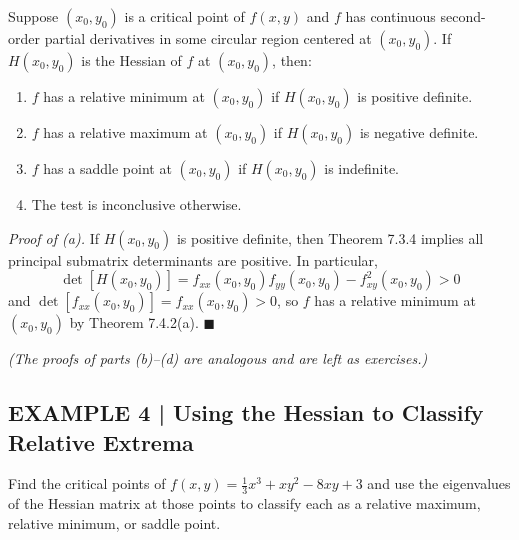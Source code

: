 \documentclass{article}
\begin{document}
\begin{tcolorbox}[colback=red!4, colframe=red!60!black,
  title={\textbf{Theorem 7.4.3 --- Hessian Form of the Second Derivative Test}},
  boxrule=0.5mm, arc=3mm]
Suppose $(x_0,y_0)$ is a critical point of $f(x,y)$ and $f$ has continuous second-order
partial derivatives in some circular region centered at $(x_0,y_0)$. If $H(x_0,y_0)$ is
the Hessian of $f$ at $(x_0,y_0)$, then:
\begin{enumerate}
  \item[(a)] $f$ has a relative minimum at $(x_0,y_0)$ if $H(x_0,y_0)$ is positive definite.
  \item[(b)] $f$ has a relative maximum at $(x_0,y_0)$ if $H(x_0,y_0)$ is negative definite.
  \item[(c)] $f$ has a saddle point at $(x_0,y_0)$ if $H(x_0,y_0)$ is indefinite.
  \item[(d)] The test is inconclusive otherwise.
\end{enumerate}
\end{tcolorbox}

\textit{Proof of (a).} If $H(x_0,y_0)$ is positive definite, then Theorem 7.3.4 implies
all principal submatrix determinants are positive. In particular,
\[
  \det[H(x_0,y_0)] = f_{xx}(x_0,y_0)f_{yy}(x_0,y_0)-f_{xy}^2(x_0,y_0)>0
\]
and $\det[f_{xx}(x_0,y_0)]=f_{xx}(x_0,y_0)>0$, so $f$ has a relative minimum at $(x_0,y_0)$
by Theorem 7.4.2(a). $\blacksquare$

\textit{(The proofs of parts (b)--(d) are analogous and are left as exercises.)}

\subsection*{EXAMPLE 4 | Using the Hessian to Classify Relative Extrema}

Find the critical points of $f(x,y)=\tfrac{1}{3}x^3+xy^2-8xy+3$ and use the eigenvalues
of the Hessian matrix at those points to classify each as a relative maximum, relative
minimum, or saddle point.
\end{document}
